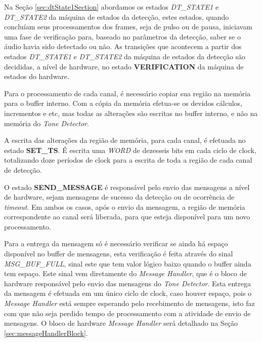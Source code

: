 \documentclass[monografia]{subfiles}
\begin{document}
			\label{sec:hardwareStateVERIFICATION}
				Na Seção \ref{sec:dtState1Section} abordamos os estados \textit{DT\_STATE1} e 
				\textit{DT\_STATE2} da máquina de estados da detecção, estes estados, quando concluíam seus processamentos dos frames, seja de 
				pulso ou de pausa, iniciavam uma fase de verificação para, baseado no parâmetros da detecção, saber se o áudio havia sido 
				detectado ou não.  As transições que acontecem a partir dos estados \textit{DT\_STATE1} e \textit{DT\_STATE2} da máquina de 
				estados da detecção são decididas, a nível de hardware, no estado \textbf{VERIFICATION} da máquina de estados do hardware.

				\newpage

			\label{sec:hardwareStateSETTS}
				Para o processamento de cada canal, é necessário copiar sua região na memória para o buffer interno. Com a cópia da memória efetua-se
				os devidos cálculos, incrementos e etc, mas todas as alterações são escritas no buffer interno, e não na memória do \textit{Tone Detector}.

				A escrita das alterações da região de memória, para cada canal, é efetuada no estado \textbf{SET\_TS}. É escrita uma \textit{WORD} de 
				dezesseis bits 
				em cada ciclo de clock, totalizando doze períodos de clock para a escrita de toda a região de cada canal de detecção.

			
			\label{sec:hardwareStateSENDMESSAGE}
				O estado \textbf{SEND\_MESSAGE} é responsável pelo envio das mensagens a nível de hardware, sejam mensagens de sucesso da detecção ou
				de ocorrência de \textit{timeout}. Em ambos os casos, após o envio da mensagem, a região de memória correspondente ao canal será liberada,
				para que esteja disponível para um novo processamento.

				Para a entrega da mensagem só é necessário verificar se ainda há espaço disponível no buffer de mensagens, esta verificação é feita
				através do sinal \textit{MSG\_BUF\_FULL}, sinal este que tem valor lógico baixo quando o buffer ainda tem espaço. 
				Este sinal vem diretamente do \textit{Message Handler}, que é o bloco de hardware
				responsável pelo envio das mensagens do \textit{Tone Detector}. Esta entrega da mensagem é efetuada em um único ciclo de clock, caso houver
				espaço, pois o
				\textit{Message Handler} está sempre esperando pelo recebimento de mensagens, isto faz com que não seja perdido tempo de processamento com
				a atividade de envio de mensagens. O bloco de hardware \textit{Message Handler} será detalhado na Seção \ref{sec:messageHandlerBlock}.
\end{document}
